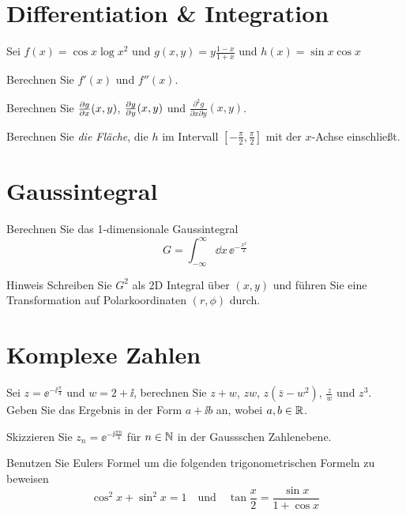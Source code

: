 \documentclass{scrartcl}
\begin{document}
\section{Differentiation \& Integration }
\label{sec:differentiation}

Sei $f(x) = \cos x \log x^2$ und $g(x, y) = y \frac{1 - x}{1 + x}$ und $h(x) = \sin x \cos x$

\begin{subex}
  \item{} Berechnen Sie $f'(x)$ und $f''(x)$.
  \item{} Berechnen Sie $\pderiv[g]{x}(x, y)$, $\pderiv[g]{y}(x, y)$ und $\frac{\partial^2 g}{\partial x \partial y}(x, y)$.
  \item{} Berechnen Sie \emph{die Fläche}, die $h$ im Intervall $[-\frac{\pi}{2}, \frac{\pi}{2}]$ mit der $x$-Achse einschließt.
\end{subex} 


\section{Gaussintegral }
\label{sec:gaussintegral}

Berechnen Sie das 1-dimensionale Gaussintegral
\[
  G = \int_{-\infty}^{\infty} \dd x \,  \ee^{-\frac{x^2}{2}} 
\]
\begin{remark}{Hinweis}
  Schreiben Sie $G^2$ als 2D Integral über $(x, y)$ und führen Sie eine Transformation auf Polarkoordinaten $(r, \phi)$ durch. 
\end{remark} 


\section{Komplexe Zahlen }
\label{sec:komplexe_zahlen}

\begin{subex}
  \item{} Sei $z = \ee^{-\ii \frac{\pi}{4}}$ und $w = 2 + \ii$, berechnen Sie $z + w$, $zw$, $z(\bar{z} - w^2)$, $\frac{z}{w}$ und $z^3$. Geben Sie das Ergebnis in der Form $a + \ii b$ an, wobei $a, b \in \RR$.
  \item{} Skizzieren Sie $z_n = \ee^{-\ii \frac{\pi n}{4}}$ für $n \in \NN$ in der Gaussschen Zahlenebene. 
  \item{} Benutzen Sie Eulers Formel um die folgenden trigonometrischen Formeln zu beweisen
  \[
    \cos^2 x + \sin^2 x = 1 \quad\mbox{und}\quad \tan \frac{x}{2} = \frac{\sin x}{1 + \cos x}
  \]
\end{subex}
\end{document}
